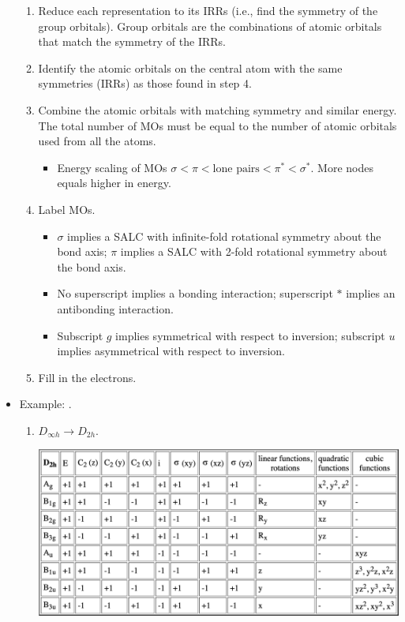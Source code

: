 \documentclass[../notes.tex]{subfiles}
\begin{document}
\begin{itemize}
\begin{enumerate}
        \item Reduce each representation to its IRRs (i.e., find the symmetry of the group orbitals). Group orbitals are the combinations of atomic orbitals that match the symmetry of the IRRs.
        \item Identify the atomic orbitals on the central atom with the same symmetries (IRRs) as those found in step 4.
        \item Combine the atomic orbitals with matching symmetry and similar energy. The total number of MOs must be equal to the number of atomic orbitals used from all the atoms.
        \begin{itemize}
            \item Energy scaling of MOs $\sigma<\pi<\text{lone pairs}<\pi^*<\sigma^*$. More nodes equals higher in energy.
        \end{itemize}
        \item Label MOs.
        \begin{itemize}
            \item $\sigma$ implies a SALC with infinite-fold rotational symmetry about the bond axis; $\pi$ implies a SALC with 2-fold rotational symmetry about the bond axis.
            \item No superscript implies a bonding interaction; superscript $*$ implies an antibonding interaction.
            \item Subscript $g$ implies symmetrical with respect to inversion; subscript $u$ implies asymmetrical with respect to inversion.
        \end{itemize}
        \item Fill in the electrons.
    \end{enumerate}
    \item Example: .
    \begin{enumerate}
        \item $D_{\infty h}\to D_{2h}$.
        \begin{table}[h!]
            \centering
            \includegraphics[width=0.8\linewidth]{../ExtFiles/charTableD2h.png}

\end{table}
\end{enumerate}
\end{itemize}
\end{document}
